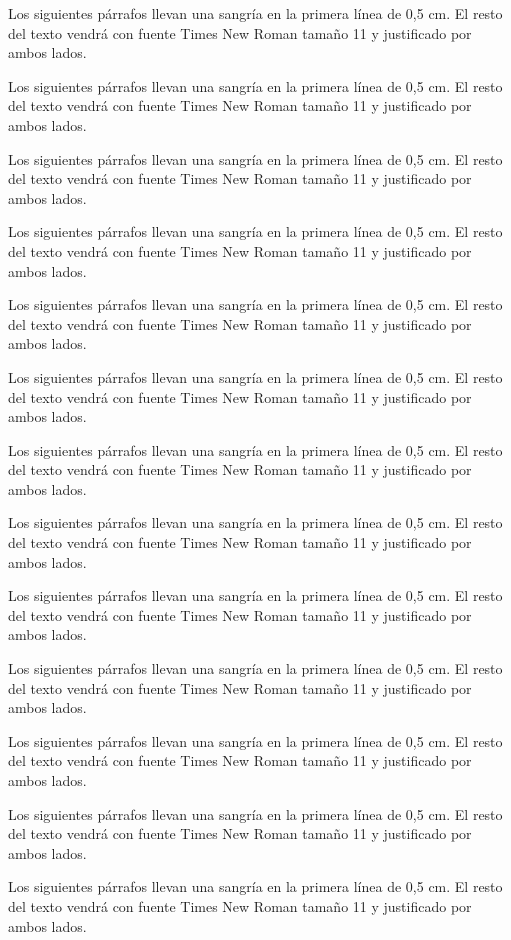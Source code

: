 \documentclass[a4paper,11pt,twocolumn,twoside]{article}
\begin{document}
Los siguientes párrafos llevan una sangría en la primera línea de
0,5 cm. El resto del texto vendrá con fuente Times New Roman
tamaño 11 y justificado por ambos lados.

Los siguientes párrafos llevan una sangría en la primera línea de
0,5 cm. El resto del texto vendrá con fuente Times New Roman
tamaño 11 y justificado por ambos lados.

Los siguientes párrafos llevan una sangría en la primera línea de
0,5 cm. El resto del texto vendrá con fuente Times New Roman
tamaño 11 y justificado por ambos lados.

Los siguientes párrafos llevan una sangría en la primera línea de
0,5 cm. El resto del texto vendrá con fuente Times New Roman
tamaño 11 y justificado por ambos lados.

Los siguientes párrafos llevan una sangría en la primera línea de
0,5 cm. El resto del texto vendrá con fuente Times New Roman
tamaño 11 y justificado por ambos lados.

Los siguientes párrafos llevan una sangría en la primera línea de
0,5 cm. El resto del texto vendrá con fuente Times New Roman
tamaño 11 y justificado por ambos lados.

Los siguientes párrafos llevan una sangría en la primera línea de
0,5 cm. El resto del texto vendrá con fuente Times New Roman
tamaño 11 y justificado por ambos lados.

Los siguientes párrafos llevan una sangría en la primera línea de
0,5 cm. El resto del texto vendrá con fuente Times New Roman
tamaño 11 y justificado por ambos lados.

Los siguientes párrafos llevan una sangría en la primera línea de
0,5 cm. El resto del texto vendrá con fuente Times New Roman
tamaño 11 y justificado por ambos lados.

Los siguientes párrafos llevan una sangría en la primera línea de
0,5 cm. El resto del texto vendrá con fuente Times New Roman
tamaño 11 y justificado por ambos lados.

Los siguientes párrafos llevan una sangría en la primera línea de
0,5 cm. El resto del texto vendrá con fuente Times New Roman
tamaño 11 y justificado por ambos lados.

Los siguientes párrafos llevan una sangría en la primera línea de
0,5 cm. El resto del texto vendrá con fuente Times New Roman
tamaño 11 y justificado por ambos lados.

Los siguientes párrafos llevan una sangría en la primera línea de
0,5 cm. El resto del texto vendrá con fuente Times New Roman
tamaño 11 y justificado por ambos lados.
\end{document}
